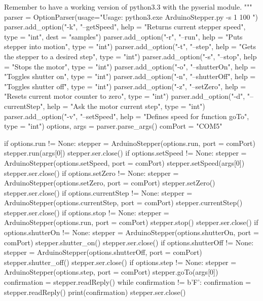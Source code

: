 \begin{python}
    Remember to have a working version of python3.3 with the 
    pyserial module.
    """
    parser = OptionParser(usage="Usage: python3.exe ArduinoStepper.py -s 1 100  ")
    parser.add_option("-k", "--getSpeed", help = "Returns current stepper speed", type = "int", dest = "samples")
    parser.add_option("-r", "--run", help = "Puts stepper into motion", type = "int")
    parser.add_option("-t", "--step", help = "Gets the stepper to a desired step", type = "int")
    parser.add_option("-s", "--stop", help = "Stops the motor", type = "int")
    parser.add_option("-o", "--shutterOn", help = "Toggles shutter on", type = "int")
    parser.add_option("-n", "--shutterOff", help = "Toggles shutter off", type = "int")
    parser.add_option("-z", "--setZero", help = "Resets current motor counter to zero", type = "int")
    parser.add_option("-d", "--currentStep", help = "Ask the motor current step", type = "int")
    parser.add_option("-v", "--setSpeed", help = "Defines speed for function goTo", type = "int")
    options, args = parser.parse_args()
    comPort = "COM5"
    
    if options.run != None:       
        stepper = ArduinoStepper(options.run, port = comPort)
        stepper.run(args[0])
        stepper.ser.close()
    if options.setSpeed != None:
        stepper = ArduinoStepper(options.setSpeed, port = comPort)
        stepper.setSpeed(args[0])
        stepper.ser.close()
    if options.setZero != None:
        stepper = ArduinoStepper(options.setZero, port = comPort)
        stepper.setZero()
        stepper.ser.close()
    if options.currentStep != None:
        stepper = ArduinoStepper(options.currentStep, port = comPort)
        stepper.currentStep()
        stepper.ser.close()
    if options.stop != None:
        stepper = ArduinoStepper(options.run, port = comPort)
        stepper.stop()
        stepper.ser.close()
    if options.shutterOn != None:
        stepper = ArduinoStepper(options.shutterOn, port = comPort)
        stepper.shutter_on()
        stepper.ser.close()
    if options.shutterOff != None:
        stepper = ArduinoStepper(options.shutterOff, port = comPort)
        stepper.shutter_off()
        stepper.ser.close()
    if options.step != None:
        stepper = ArduinoStepper(options.step, port = comPort)
        stepper.goTo(args[0])
        confirmation = stepper.readReply()
        while confirmation != b'F':
            confirmation = stepper.readReply()
        print(confirmation)
        stepper.ser.close()
\end{python}



